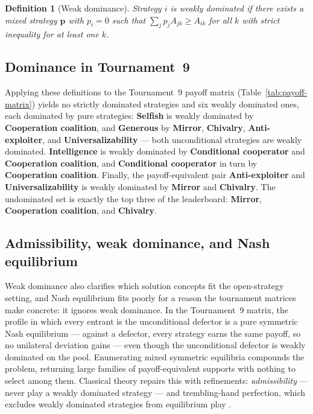 \documentclass[11pt]{article}
\newtheorem{definition}{Definition}
\begin{document}
\begin{definition}[Weak dominance]
Strategy $i$ is \emph{weakly dominated} if there exists a mixed
strategy $\mathbf{p}$ with $p_i = 0$ such that
$\sum_j p_j A_{jk} \geq A_{ik}$ for all $k$
with strict inequality for at least one $k$.
\end{definition}

\subsection{Dominance in Tournament~9}
\label{sec:dominance-results}

Applying these definitions to the Tournament~9 payoff matrix
(Table~\ref{tab:payoff-matrix}) yields no strictly dominated
strategies and six weakly dominated ones, each dominated by pure
strategies:
\textbf{Selfish} is weakly dominated by \textbf{Cooperation
coalition}, and \textbf{Generous} by \textbf{Mirror},
\textbf{Chivalry}, \textbf{Anti-exploiter}, and
\textbf{Universalizability} --- both unconditional strategies are
weakly dominated.
\textbf{Intelligence} is weakly dominated by \textbf{Conditional
cooperator} and \textbf{Cooperation coalition}, and
\textbf{Conditional cooperator} in turn by \textbf{Cooperation
coalition}.
Finally, the payoff-equivalent pair \textbf{Anti-exploiter} and
\textbf{Universalizability} is weakly dominated by \textbf{Mirror}
and \textbf{Chivalry}.
The undominated set is exactly the top three of the leaderboard:
\textbf{Mirror}, \textbf{Cooperation coalition}, and
\textbf{Chivalry}.

\subsection{Admissibility, weak dominance, and Nash equilibrium}
\label{sec:admissibility}

Weak dominance also clarifies which solution concepts fit the
open-strategy setting, and Nash equilibrium fits poorly for a reason
the tournament matrices make concrete: it ignores weak dominance.
In the Tournament~9 matrix, the profile in which every entrant is the
unconditional defector is a pure symmetric Nash equilibrium --- against
a defector, every strategy earns the same payoff, so no unilateral
deviation gains --- even though the unconditional defector is weakly
dominated on the pool.
Enumerating mixed symmetric equilibria compounds the problem,
returning large families of payoff-equivalent supports with nothing to
select among them.
Classical theory repairs this with refinements: \emph{admissibility}
--- never play a weakly dominated strategy \citep{luce1957games} ---
and trembling-hand perfection, which excludes weakly dominated
strategies from equilibrium play \citep{selten1975reexamination}.
\end{document}
